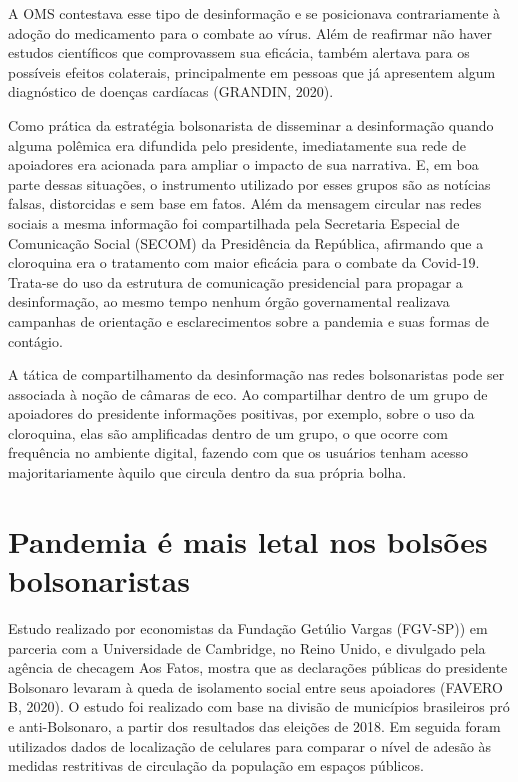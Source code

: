 A OMS contestava esse tipo de desinformação e se posicionava
contrariamente à adoção do medicamento para o combate ao vírus. Além de
reafirmar não haver estudos científicos que comprovassem sua eficácia,
também alertava para os possíveis efeitos colaterais, principalmente em
pessoas que já apresentem algum diagnóstico de doenças cardíacas
(GRANDIN, 2020).

Como prática da estratégia bolsonarista de disseminar a desinformação
quando alguma polêmica era difundida pelo presidente, imediatamente sua
rede de apoiadores era acionada para ampliar o impacto de sua narrativa.
E, em boa parte dessas situações, o instrumento utilizado por esses
grupos são as notícias falsas, distorcidas e sem base em fatos. Além da
mensagem circular nas redes sociais a mesma informação foi compartilhada
pela Secretaria Especial de Comunicação Social (SECOM) da Presidência da
República, afirmando que a cloroquina era o tratamento com maior
eficácia para o combate da Covid-19. Trata-se do uso da estrutura de
comunicação presidencial para propagar a desinformação, ao mesmo tempo
nenhum órgão governamental realizava campanhas de orientação e
esclarecimentos sobre a pandemia e suas formas de contágio.

A tática de compartilhamento da desinformação nas redes bolsonaristas
pode ser associada à noção de câmaras de eco. Ao compartilhar dentro de
um grupo de apoiadores do presidente informações positivas, por exemplo,
sobre o uso da cloroquina, elas são amplificadas dentro de um grupo, o
que ocorre com frequência no ambiente digital, fazendo com que os
usuários tenham acesso majoritariamente àquilo que circula dentro da sua
própria bolha.

\section{Pandemia é mais letal nos bolsões bolsonaristas}

Estudo realizado por economistas da Fundação Getúlio Vargas (FGV-SP)) em
parceria com a Universidade de Cambridge, no Reino Unido, e divulgado
pela agência de checagem Aos Fatos, mostra que as declarações públicas
do presidente Bolsonaro levaram à queda de isolamento social entre seus
apoiadores (FAVERO B, 2020). O estudo foi realizado com base na divisão
de municípios brasileiros pró e anti-Bolsonaro, a partir dos resultados
das eleições de 2018. Em seguida foram utilizados dados de localização
de celulares para comparar o nível de adesão às medidas restritivas de
circulação da população em espaços públicos.

